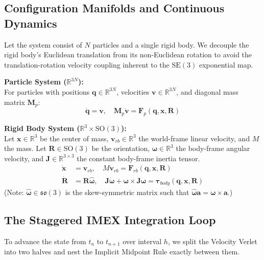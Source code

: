\subsection{Configuration Manifolds and Continuous Dynamics}
Let the system consist of $N$ particles and a single rigid body. We decouple the rigid body's Euclidean translation from its non-Euclidean rotation to avoid the translation-rotation velocity coupling inherent to the $\text{SE}(3)$ exponential map.

\textbf{Particle System ($\mathbb{R}^{3N}$):}\\
For particles with positions $\mathbf{q} \in \mathbb{R}^{3N}$, velocities $\mathbf{v} \in \mathbb{R}^{3N}$, and diagonal mass matrix $\mathbf{M}_p$:
\begin{equation}
    \dot{\mathbf{q}} = \mathbf{v}, \quad \mathbf{M}_p \dot{\mathbf{v}} = \mathbf{F}_p(\mathbf{q}, \mathbf{x}, \mathbf{R})
\end{equation}

\textbf{Rigid Body System ($\mathbb{R}^3 \times \text{SO}(3)$):}\\
Let $\mathbf{x} \in \mathbb{R}^3$ be the center of mass, $\mathbf{v}_{rb} \in \mathbb{R}^3$ the world-frame linear velocity, and $M$ the mass. Let $\mathbf{R} \in \text{SO}(3)$ be the orientation, $\boldsymbol{\omega} \in \mathbb{R}^3$ the body-frame angular velocity, and $\mathbf{J} \in \mathbb{R}^{3\times3}$ the constant body-frame inertia tensor.
\begin{align}
    \dot{\mathbf{x}} &= \mathbf{v}_{rb}, \quad M \dot{\mathbf{v}}_{rb} = \mathbf{F}_{rb}(\mathbf{q}, \mathbf{x}, \mathbf{R}) \\
    \dot{\mathbf{R}} &= \mathbf{R} \widehat{\boldsymbol{\omega}}, \quad \mathbf{J}\dot{\boldsymbol{\omega}} + \boldsymbol{\omega} \times \mathbf{J}\boldsymbol{\omega} = \boldsymbol{\tau}_{body}(\mathbf{q}, \mathbf{x}, \mathbf{R})
\end{align}
(Note: $\widehat{\boldsymbol{\omega}} \in \mathfrak{so}(3)$ is the skew-symmetric matrix such that $\widehat{\boldsymbol{\omega}}\mathbf{a} = \boldsymbol{\omega} \times \mathbf{a}$.)

\subsection{The Staggered IMEX Integration Loop}
To advance the state from $t_n$ to $t_{n+1}$ over interval $h$, we split the Velocity Verlet into two halves and nest the Implicit Midpoint Rule exactly between them.

